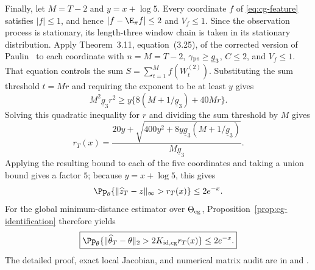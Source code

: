 Finally, let $M=T-2$ and $y=x+\log5$.  Every coordinate $f$ of
\eqref{eq:cg-feature} satisfies $|f|\le1$, and hence
$|f-\E_\pi f|\le2$ and $V_f\le1$.  Since the observation process is
stationary, its length-three window chain is taken in its stationary
distribution.  Apply Theorem~3.11, equation~(3.25), of the corrected version
of Paulin~\cite{Paulin2015} to each coordinate with $n=M=T-2$,
$\gamma_{\rm ps}\ge\underline g_3$, $C\le2$, and $V_f\le1$.  That equation
controls the sum
$S=\sum_{t=1}^{M}f(W_t^{(2)})$.  Substituting the sum threshold $t=Mr$ and
requiring the exponent to be at least $y$ gives
\[
 M^2\underline g_3 r^2
 \ge y\{8(M+1/\underline g_3)+40Mr\}.
\]
Solving this quadratic inequality for $r$ and dividing the sum threshold by
$M$ gives
\begin{equation}
 r_T(x)=\frac{20y+
 \sqrt{400y^2+8y\underline g_3(M+1/\underline g_3)}}
 {M\underline g_3}.
 \label{eq:cg-explicit-radius}
\end{equation}
Applying the resulting bound to each of the five coordinates and taking a
union bound gives a factor $5$; because $y=x+\log5$, this gives
\[
 \Pp_\theta\{\|\widehat z_T-z\|_\infty>r_T(x)\}\le2e^{-x}.
\]
For the global minimum-distance estimator over $\Theta_{\rm cg}$,
Proposition~\ref{prop:cg-identification} therefore yields
\begin{equation}
 \boxed{
 \Pp_\theta\{\|\widehat\theta_T-\theta\|_2>
 2K_{\rm id,cg}r_T(x)\}\le2e^{-x}.}
 \label{eq:cg-end-to-end}
\end{equation}
The detailed proof, exact local Jacobian, and numerical matrix audit are in
 and
.
